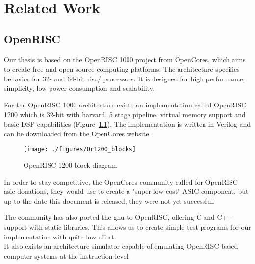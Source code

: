 
\chapter{Related Work}

\section{OpenRISC}

Our thesis is based on the OpenRISC 1000 project from OpenCores\cite{website:OpenCores}\cite{or1000}, which aims to create free and open source computing platforms. The architecture specifies behavior for 32- and 64-bit \gls{risc}/ processors. It is designed for high performance, simplicity, low power consumption and scalability.

For the OpenRISC 1000 architecture exists an implementation called OpenRISC 1200 which is 32-bit with \gls{harvard}, 5 stage pipeline, virtual memory support and basic DSP capabilities (Figure~\ref{fig:or1200}). The implementation is written in Verilog and can be downloaded from the OpenCores website.\cite{or1200}

\begin{figure}[htbp]
  \centering
  \texttt{[image: ./figures/Or1200\_blocks]}
  \caption{OpenRISC 1200 block diagram}
  \label{fig:or1200}
\end{figure}

In order to stay competitive, the OpenCores community called for OpenRISC \gls{asic} donations, they would use to create a "super-low-cost"  ASIC component, but up to the date this document is released, they were not yet successful.

The community has also ported the \gls{gnu} to OpenRISC, offering C and C++ support with static libraries. This allows us to create simple test programs for our implementation with quite low effort.\\
It also exists an architecture simulator capable of emulating OpenRISC based computer systems at the instruction level.
